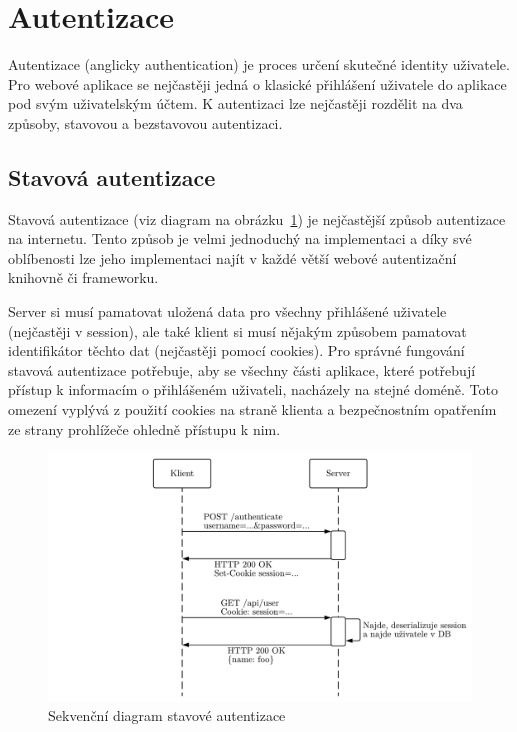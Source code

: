 
\section{Autentizace}\label{sec:autentizace}

Autentizace (anglicky authentication) je proces určení skutečné identity uživatele.
Pro webové aplikace se nejčastěji jedná o klasické přihlášení uživatele do aplikace pod svým uživatelským účtem.
K autentizaci lze nejčastěji rozdělit na dva způsoby, stavovou a bezstavovou autentizaci.

\subsection{Stavová autentizace}\label{subsec:stavováAutentizace}
Stavová autentizace (viz diagram na obrázku~\ref{fig:statefullAuthentication}) je nejčastější způsob autentizace na internetu.
Tento způsob je velmi jednoduchý na implementaci a díky své oblíbenosti lze jeho implementaci najít v každé větší webové autentizační knihovně či frameworku.

Server si musí pamatovat uložená data pro všechny přihlášené uživatele (nejčastěji v session), ale také klient si musí nějakým způsobem pamatovat identifikátor těchto dat (nejčastěji pomocí cookies).
Pro správné fungování stavová autentizace potřebuje, aby se všechny části aplikace, které potřebují přístup k informacím o přihlášeném uživateli, nacházely na stejné doméně.
Toto omezení vyplývá z použití cookies na straně klienta a bezpečnostním opatřením ze strany prohlížeče ohledně přístupu k nim.

\begin{figure}[ht!]
    \centering
    \includegraphics[width=\textwidth]{partials/navrh/statefullAuthentication.pdf}
    \caption{Sekvenční diagram stavové autentizace}\label{fig:statefullAuthentication}
\end{figure}

